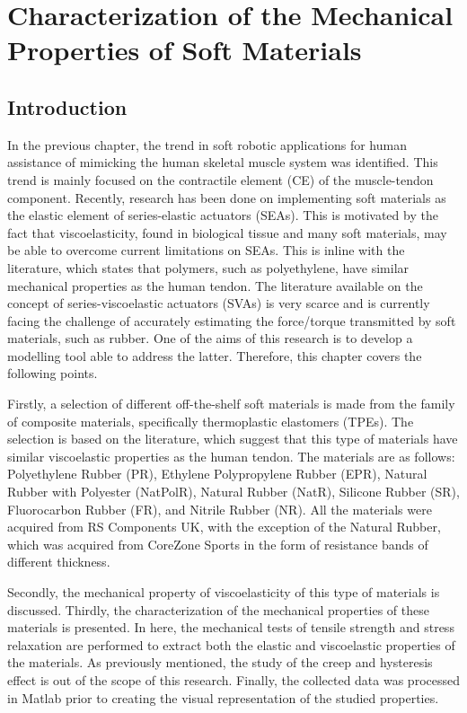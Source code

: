 \chapter{Characterization of the Mechanical Properties of Soft Materials} \label{ch:characterizationSoft}

\section{Introduction}

In the previous chapter, the trend in soft robotic applications for human assistance of mimicking the human skeletal muscle system was identified. This trend is mainly focused on the contractile element (CE) of the muscle-tendon component. Recently, research has been done on implementing soft materials as the elastic element of series-elastic actuators (SEAs). This is motivated by the fact that viscoelasticity, found in biological tissue and many soft materials, may be able to overcome current limitations on SEAs. This is inline with the literature, which states that polymers, such as polyethylene, have similar mechanical properties as the human tendon. The literature available on the concept of series-viscoelastic actuators (SVAs) is very scarce and is currently facing the challenge of accurately estimating the force/torque transmitted by soft materials, such as rubber. One of the aims of this research is to develop a modelling tool able to address the latter. Therefore, this chapter covers the following points.

Firstly, a selection of different off-the-shelf soft materials is made from the family of composite materials, specifically thermoplastic elastomers (TPEs). The selection is based on the literature, which suggest that this type of materials have similar viscoelastic properties as the human tendon. The materials are as follows: Polyethylene Rubber (PR), Ethylene Polypropylene Rubber (EPR), Natural Rubber with Polyester (NatPolR), Natural Rubber (NatR), Silicone Rubber (SR), Fluorocarbon Rubber (FR), and Nitrile Rubber (NR). All the materials were acquired from RS Components UK\textregistered{}, with the exception of the Natural Rubber, which was acquired from CoreZone Sports\textregistered{} in the form of resistance bands of different thickness.

Secondly, the mechanical property of viscoelasticity of this type of materials is discussed. Thirdly, the characterization of the mechanical properties of these materials is presented. In here, the mechanical tests of tensile strength and stress relaxation are performed to extract both the elastic and viscoelastic properties of the materials. As previously mentioned, the study of the creep and hysteresis effect is out of the scope of this research. Finally, the collected data was processed in Matlab\textregistered{} prior to creating the visual representation of the studied properties. 

